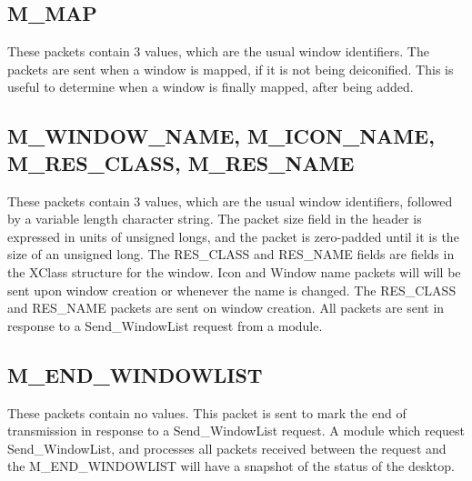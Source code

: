 \subsection{M\_MAP}
These packets contain 3 values, which are the usual window
identifiers. The packets are sent when a window is mapped, if it is
not being deiconified. This is useful to determine when a window is
finally mapped, after being added.

\subsection{M\_WINDOW\_NAME, M\_ICON\_NAME, M\_RES\_CLASS, M\_RES\_NAME}
These packets contain 3 values, which are the usual window
identifiers, followed by a variable length character string. The
packet size field in the header is expressed in units of unsigned
longs, and the packet is zero-padded until it is the  size of an
unsigned long. The RES\_CLASS and RES\_NAME fields are fields in the
XClass structure for the window. Icon and Window name packets will
will be sent upon window creation or whenever the name is changed. The
RES\_CLASS and RES\_NAME packets are sent on window creation. All
packets are sent in response to a Send\_WindowList request from a module.

\subsection{M\_END\_WINDOWLIST}
These packets contain no values. This packet is sent to mark the end
of transmission in response to  a Send\_WindowList request. A module
which request Send\_WindowList, and processes all packets received
between the request and the M\_END\_WINDOWLIST will have a snapshot of
the status of the desktop.





